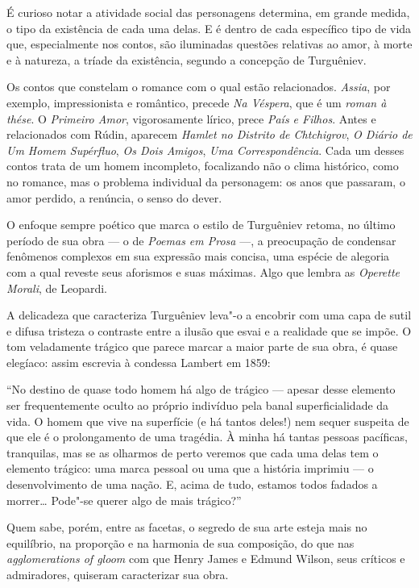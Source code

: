 É curioso notar a atividade social das personagens determina, em grande
medida, o tipo da existência de cada uma delas. E é dentro de cada
específico tipo de vida que, especialmente nos contos, são iluminadas
questões relativas ao amor, à morte e à natureza, a tríade da
existência, segundo a concepção de Turguêniev.

Os contos que constelam o romance com o qual estão relacionados.
\emph{Assia}, por exemplo, impressionista e romântico, precede \emph{Na
Véspera}, que é um \emph{roman à thése}. O \emph{Primeiro Amor},
vigorosamente lírico, prece \emph{País e Filhos}. Antes e relacionados
com Rúdin, aparecem \emph{Hamlet no Distrito de Chtchigrov}, \emph{O
Diário de Um Homem Supérfluo}, \emph{Os Dois Amigos}, \emph{Uma
Correspondência}. Cada um desses contos trata de um homem incompleto,
focalizando não o clima histórico, como no romance, mas o problema
individual da personagem: os anos que passaram, o amor perdido, a
renúncia, o senso do dever.

O enfoque sempre poético que marca o estilo de Turguêniev retoma, no
último período de sua obra --- o de \emph{Poemas em Prosa} ---, a
preocupação de condensar fenômenos complexos em sua expressão mais
concisa, uma espécie de alegoria com a qual reveste seus aforismos e
suas máximas. Algo que lembra as \emph{Operette Morali}, de Leopardi.

A delicadeza que caracteriza Turguêniev leva"-o a encobrir com uma capa
de sutil e difusa tristeza o contraste entre a ilusão que esvai e a
realidade que se impõe. O tom veladamente trágico que parece marcar a
maior parte de sua obra, é quase elegíaco: assim escrevia à condessa
Lambert em 1859:

``No destino de quase todo homem há algo de trágico --- apesar desse
elemento ser frequentemente oculto ao próprio indivíduo pela banal
superficialidade da vida. O homem que vive na superfície (e há tantos
deles!) nem sequer suspeita de que ele é o prolongamento de uma
tragédia. À minha há tantas pessoas pacíficas, tranquilas, mas se as
olharmos de perto veremos que cada uma delas tem o elemento trágico: uma
marca pessoal ou uma que a história imprimiu --- o desenvolvimento de uma
nação. E, acima de tudo, estamos todos fadados a morrer\ldots{} Pode"-se
querer algo de mais trágico?''

Quem sabe, porém, entre as facetas, o segredo de sua arte esteja mais no
equilíbrio, na proporção e na harmonia de sua composição, do que nas
\emph{agglomerations of gloom} com que Henry James e Edmund Wilson, seus
críticos e admiradores, quiseram caracterizar sua obra.

